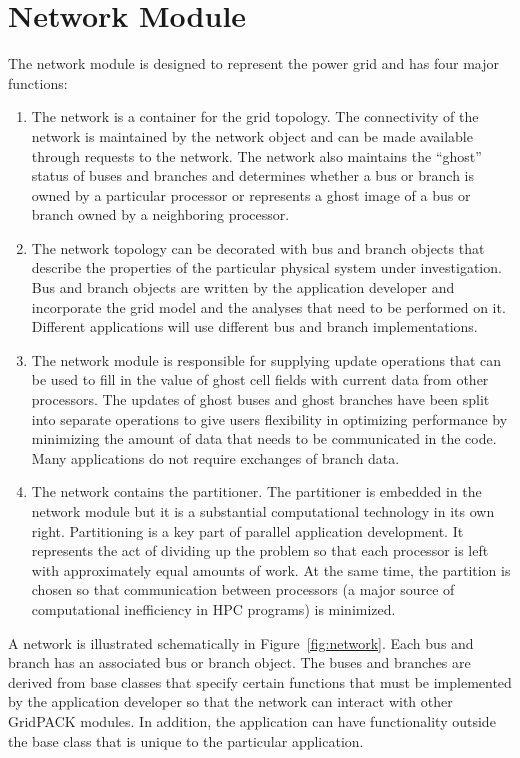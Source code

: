 \section{Network Module}

The network module is designed to represent the power grid and has four major functions:

\begin{enumerate}
\item  The network is a container for the grid topology. The connectivity of the network is maintained by the network object and can be made available through requests to the network. The network also maintains the ``ghost'' status of buses and branches and determines whether a bus or branch is owned by a particular processor or represents a ghost image of a bus or branch owned by a neighboring processor.

\item  The network topology can be decorated with bus and branch objects that describe the properties of the particular physical system under investigation. Bus and branch objects are written by the application developer and incorporate the grid model and the analyses that need to be performed on it. Different applications will use different bus and branch implementations.

\item  The network module is responsible for supplying update operations that can be used to fill in the value of ghost cell fields with current data from other processors. The updates of ghost buses and ghost branches have been split into separate operations to give users flexibility in optimizing performance by minimizing the amount of data that needs to be communicated in the code. Many applications do not require exchanges of branch data.

\item  The network contains the partitioner. The partitioner is embedded in the network module but it is a substantial computational technology in its own right. Partitioning is a key part of parallel application development. It represents the act of dividing up the problem so that each processor is left with approximately equal amounts of work. At the same time, the partition is chosen so that communication between processors (a major source of computational inefficiency in HPC programs) is minimized. 
\end{enumerate}

A network is illustrated schematically in Figure~\ref{fig:network}. Each bus and branch has an associated bus or branch object. The buses and branches are derived from base classes that specify certain functions that must be implemented by the application developer so that the network can interact with other GridPACK modules. In addition, the application can have functionality outside the base class that is unique to the particular application.

